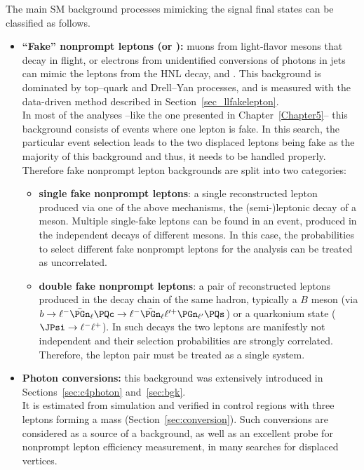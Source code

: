 The main SM background processes mimicking the signal final states can be
classified as follows.
\begin{itemize}
\item \textbf{``Fake'' nonprompt leptons (\Pe or \PGm):}
  muons from light-flavor mesons that decay in flight, or electrons from
  unidentified conversions of photons in jets
  can mimic the \displ leptons from the HNL decay, \ltwo and
  \lthree.
  This background is dominated by top--quark and Drell--Yan processes,
  and is measured with the data-driven method described in
  Section~\ref{sec_llfakelepton}.\\
In most of the analyses --like the one presented in Chapter~\ref{Chapter5}-- this
background consists of events where one lepton is fake. 
In this search, the particular event selection leads to the two
displaced leptons being fake as the majority of this background and thus, it needs to be handled properly.
Therefore fake nonprompt lepton
backgrounds are split into two categories:
  \begin{itemize}
  \item \textbf{single fake nonprompt leptons}:
    a single reconstructed lepton produced via one of the above
    mechanisms, \eg the (semi-)leptonic decay of a meson.
    Multiple single-fake leptons can be found in an event,
    produced in the independent decays of different mesons.
    In this case, the probabilities to select different fake nonprompt
    leptons for the analysis can be treated as uncorrelated.
  \item \textbf{double fake nonprompt leptons}:
    a pair of reconstructed leptons produced in the decay chain of the
    same hadron, typically a $B$ meson (\eg via
    $b\to\ell^-\bar{\PGn}_{\ell}\PQc\to\ell^-\bar{\PGn}_{\ell}\ell^{\prime+}\PGn_{\ell^{\prime}}\PQs$)
    or a quarkonium state (\eg $\JPsi\to\ell^-\ell^+$).
    In such decays the two leptons are manifestly not independent and
    their selection probabilities are strongly correlated.
    Therefore, the lepton pair must be treated as a single system.
  \end{itemize}
\item \textbf{Photon conversions:} this background was extensively
  introduced in Sections~\ref{sec:c4photon} and~\ref{sec:bgk}.\\
  It is estimated from simulation and verified in control regions with
  three leptons forming a \PZ mass (Section~\ref{sec:conversion}).
  Such conversions are considered as a
  source of a background, as well as an excellent probe for nonprompt
  lepton efficiency
 measurement, in many searches for displaced vertices.

\end{itemize}
 
